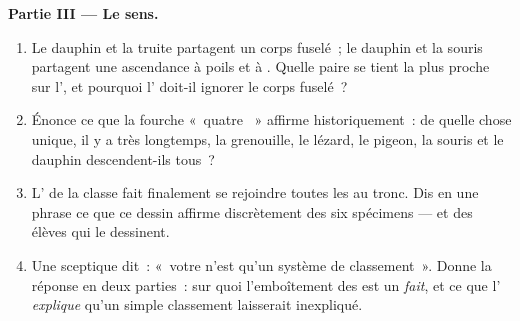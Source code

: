 \begin{problem}
\medskip\noindent\textbf{Partie III --- Le sens.}
\begin{enumerate}[resume]
  \item Le dauphin et la truite partagent un corps fuselé~; le
        dauphin et la souris partagent une ascendance à poils et à
        . Quelle paire se tient la plus proche sur l', et
        pourquoi l' doit-il ignorer le corps fuselé~?
  \item Énonce ce que la fourche «~quatre ~» affirme
        historiquement~: de quelle chose unique, il y a très
        longtemps, la grenouille, le lézard, le pigeon, la souris
        et le dauphin descendent-ils tous~?
  \item L' de la classe fait finalement se rejoindre toutes
        les  au tronc. Dis en une phrase ce que ce dessin
        affirme discrètement des six spécimens --- et des élèves
        qui le dessinent.
  \item Une sceptique dit~: «~votre  n'est qu'un système de
        classement~». Donne la réponse en deux parties~: sur quoi
        l'emboîtement des  est un \emph{fait}, et ce que
        l' \emph{explique} qu'un simple classement laisserait
        inexpliqué.
\end{enumerate}
\end{problem}
